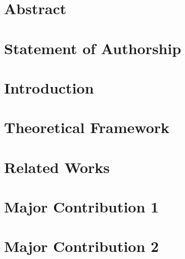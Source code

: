 \documentclass[twoside,openright,titlepage,numbers=noenddot,headinclude,footinclude=true,cleardoublepage=empty,listof=totoc,paper=a4,fontsize=11pt,australian,twoside=semi,DIV=calc]{scrreprt}
\begin{document}
  \frenchspacing
  \raggedbottom
  
  \pagestyle{plain}
  
  
  \singlespacing
  
  
  
  \onehalfspacing
  
  
  \chapter*{Abstract}
  
  
  \chapter*{Statement of Authorship}
  
  
  
  
  
  
  \cleardoublepage
  \pagestyle{scrheadings}
  \onehalfspacing
  
  \chapter{Introduction}\label{c:Introduction}
  
  
  \chapter{Theoretical Framework}\label{c:Background}
  
  
  \chapter{Related Works}\label{c:Related-Works}
  
  
  \chapter{Major Contribution 1}\label{c:Contribution-1}
  
  
  \chapter{Major Contribution 2}\label{c:Contribution-2}
  
\end{document}
